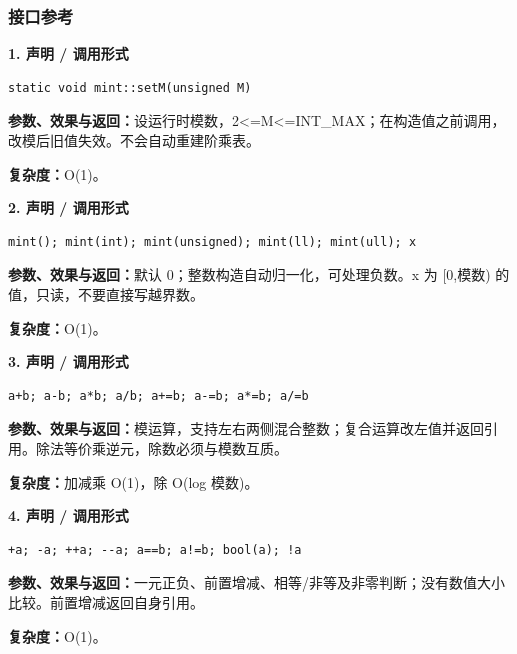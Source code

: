\documentclass[UTF8,a4paper,10pt]{ctexart}
\begin{document}
\subsubsection*{接口参考}
\noindent\begin{minipage}{\textwidth}
\textbf{1. 声明 / 调用形式}
\begin{lstlisting}
static void mint::setM(unsigned M)
\end{lstlisting}
\textbf{参数、效果与返回：}设运行时模数，2<=M<=INT\_MAX；在构造值之前调用，改模后旧值失效。不会自动重建阶乘表。

\textbf{复杂度：}O(1)。

\end{minipage}\par\vspace{0.4em}
\noindent\begin{minipage}{\textwidth}
\textbf{2. 声明 / 调用形式}
\begin{lstlisting}
mint(); mint(int); mint(unsigned); mint(ll); mint(ull); x
\end{lstlisting}
\textbf{参数、效果与返回：}默认 0；整数构造自动归一化，可处理负数。x 为 [0,模数) 的值，只读，不要直接写越界数。

\textbf{复杂度：}O(1)。

\end{minipage}\par\vspace{0.4em}
\noindent\begin{minipage}{\textwidth}
\textbf{3. 声明 / 调用形式}
\begin{lstlisting}
a+b; a-b; a*b; a/b; a+=b; a-=b; a*=b; a/=b
\end{lstlisting}
\textbf{参数、效果与返回：}模运算，支持左右两侧混合整数；复合运算改左值并返回引用。除法等价乘逆元，除数必须与模数互质。

\textbf{复杂度：}加减乘 O(1)，除 O(log 模数)。

\end{minipage}\par\vspace{0.4em}
\noindent\begin{minipage}{\textwidth}
\textbf{4. 声明 / 调用形式}
\begin{lstlisting}
+a; -a; ++a; --a; a==b; a!=b; bool(a); !a
\end{lstlisting}
\textbf{参数、效果与返回：}一元正负、前置增减、相等/非等及非零判断；没有数值大小比较。前置增减返回自身引用。

\textbf{复杂度：}O(1)。

\end{minipage}\par\vspace{0.4em}
\end{document}
